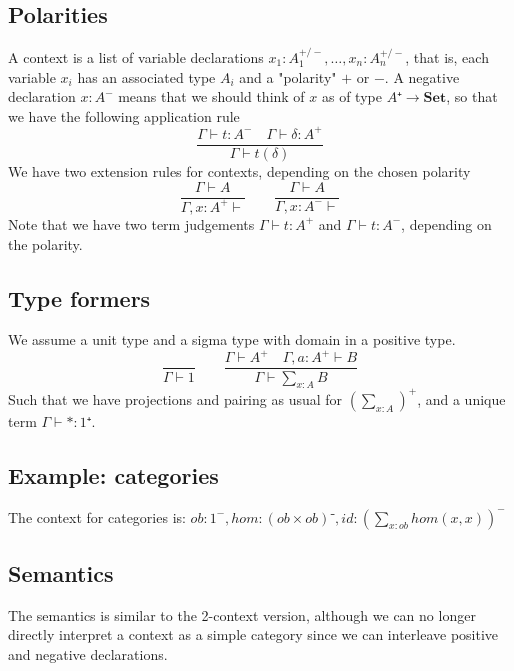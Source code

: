 \documentclass{article}
\begin{document}
\subsection{Polarities}
A context is a list of variable declarations
$x_1 : A_1^{+/-}, …, x_n : A_n^{+/-}$, that is,
each variable $x_i$ has an associated type $A_i$ and a "polarity" $+$ or $-$. 
A negative declaration $x:A^-$ means that we should think of $x$ as of type $A⁺ → 𝐒𝐞𝐭$, so that we 
have the following application rule 
\[
\dfrac{Γ⊢t:A^- \quad Γ⊢δ:A^+}{Γ⊢t(δ)}
\]
We have two extension rules for contexts, depending on the chosen polarity
\[
\dfrac{Γ⊢A}{Γ,x:A^+ ⊢}
\qquad 
\dfrac{Γ⊢A}{Γ,x:A^- ⊢}
\]
Note that we have two term judgements $Γ⊢t:A^+$ and $Γ⊢t:A^-$, depending on the polarity.
\subsection{Type formers}
We assume a unit type and a sigma type with domain in a positive type. 
\[
\dfrac{}{Γ ⊢ 1}
\qquad 
\dfrac{Γ ⊢ A^+ \quad Γ, a:A^+ ⊢ B}{Γ ⊢ ∑_{x:A} B}
\]
Such that we have projections and pairing as usual for $(∑_{x:A})^+$, and a unique term
$Γ ⊢ * : 1⁺$.

\subsection{Example: categories}
The context for categories is: 
$
ob:1^-, hom: (ob × ob)⁻ 
, id : (∑_{x:ob} hom(x,x))^-
$

\subsection{Semantics}
The semantics is similar to the 2-context version, although we can no longer directly interpret 
a context as a simple category since we can interleave positive and negative declarations.



\end{document}

